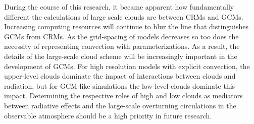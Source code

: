 \documentclass[draft]{agujournal2019}
\begin{document}
{%

% 

During the course of this research, it became apparent how fundamentally different the calculations of large scale clouds are between CRMs and GCMs.
Increasing computing resources will continue to blur the line that distinguishes GCMs from CRMs. 
As the grid-spacing of models decreases so too does the necessity of representing convection with parameterizations. 
As a result, the details of the large-scale cloud scheme will be increasingly important in the development of GCMs. 
For high resolution models with explicit convection, the upper-level clouds dominate the impact of interactions between 
clouds and radiation, but for GCM-like simulations the low-level clouds dominate this impact.  
Determining the respective roles of high and low clouds as mediators between radiative effects and the large-scale overturning 
circulations in the observable atmosphere should be a high priority in future research.     

}
\end{document}
